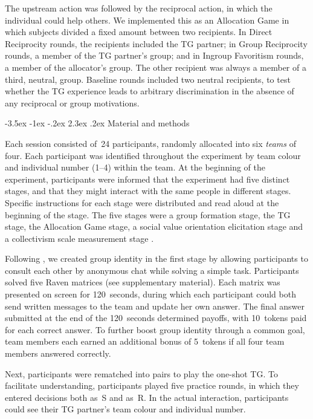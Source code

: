 \documentclass[12pt,a4paper]{article}\usepackage[]{graphicx}\usepackage[]{color}
\makeatletter
\renewcommand\section{\@startsection {section}{1}{\z@}%
{-3.5ex \@plus -1ex \@minus -.2ex}%
{2.3ex \@plus.2ex}%
{\bf\sffamily\Large}}
\makeatother
\begin{document}
The upstream action was followed by the reciprocal action, 
in which the individual could help others. We implemented this as an Allocation
Game in which subjects divided a fixed amount between two recipients.
In Direct Reciprocity rounds, the recipients included the TG partner;
in Group Reciprocity rounds, a member of the TG partner's group; and
in Ingroup Favoritism rounds, a member of the allocator's group.
The other recipient was always a member of a third, neutral, group.
Baseline rounds included two neutral recipients, to test whether the
TG experience leads to arbitrary discrimination in the absence of any reciprocal
or group motivations.

\section{Material and methods}
\label{sec:design}

Each session consisted of~24 participants, randomly allocated into six
\emph{teams} of four. Each participant was identified throughout the experiment
by team colour and individual number (1--4) within the team. At the beginning of
the experiment, participants were informed that the experiment had five distinct
stages, and that they might interact with the same people in different stages.
Specific instructions for each stage were distributed and read aloud at the
beginning of the stage. The five stages were a group formation stage, the TG
stage, the Allocation Game stage, a social value orientation elicitation stage
\citep*{murphy2011measuring} and a collectivism scale measurement stage
\citep*[adapted from the horizontal collectivism scale
in][]{Singelis1995horizontal}.

Following \citep{chen2009group}, we created group identity in the
first stage by allowing participants to consult each other by anonymous
chat while solving a simple task. Participants solved five Raven matrices
(see supplementary material). Each matrix was presented on screen
for 120~seconds, during which each participant could both send written
messages to the team and update her own answer. The final answer submitted
at the end of the 120~seconds determined payoffs, with 10~tokens
paid for each correct answer. To further boost group identity through
a common goal, team members each earned an additional bonus of 5~tokens
if all four team members answered correctly.

Next, participants were rematched into pairs to play the one-shot
TG. To facilitate understanding, participants played five practice
rounds, in which they entered decisions both as~S and as~R. In the
actual interaction, participants could see their TG partner's team
colour and individual number. 
\end{document}
